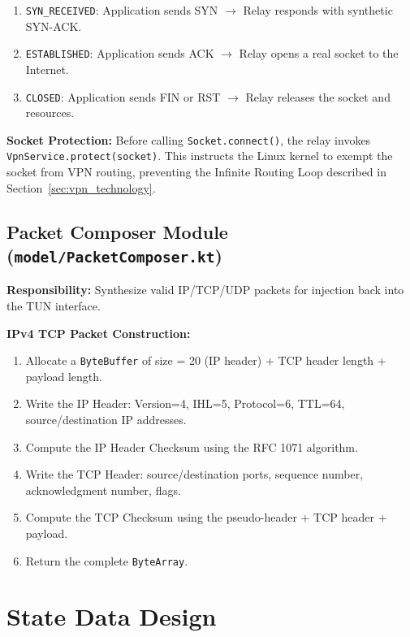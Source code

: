 \begin{enumerate}
    \item \texttt{SYN\_RECEIVED}: Application sends SYN $\rightarrow$ Relay responds with synthetic SYN-ACK.
    \item \texttt{ESTABLISHED}: Application sends ACK $\rightarrow$ Relay opens a real socket to the Internet.
    \item \texttt{CLOSED}: Application sends FIN or RST $\rightarrow$ Relay releases the socket and resources.
\end{enumerate}

\textbf{Socket Protection:} Before calling \texttt{Socket.connect()}, the relay invokes \texttt{VpnService.protect(socket)}. This instructs the Linux kernel to exempt the socket from VPN routing, preventing the Infinite Routing Loop described in Section~\ref{sec:vpn_technology}.

\subsection{Packet Composer Module (\texttt{model/PacketComposer.kt})}

\textbf{Responsibility:} Synthesize valid IP/TCP/UDP packets for injection back into the TUN interface.

\textbf{IPv4 TCP Packet Construction:}
\begin{enumerate}
    \item Allocate a \texttt{ByteBuffer} of size = 20 (IP header) + TCP header length + payload length.
    \item Write the IP Header: Version=4, IHL=5, Protocol=6, TTL=64, source/destination IP addresses.
    \item Compute the IP Header Checksum using the RFC 1071 algorithm.
    \item Write the TCP Header: source/destination ports, sequence number, acknowledgment number, flags.
    \item Compute the TCP Checksum using the pseudo-header + TCP header + payload.
    \item Return the complete \texttt{ByteArray}.
\end{enumerate}


\section{State Data Design}
\label{sec:state_design}

